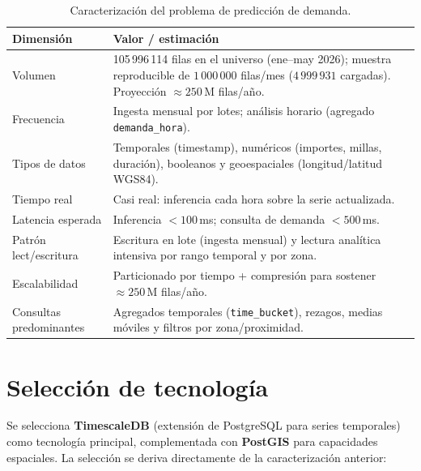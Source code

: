 \documentclass[11pt,a4paper]{article}
\begin{document}
\begin{table}[h]
\centering
\begin{tabular}{@{}p{4.6cm}p{8.6cm}@{}}
\toprule
\textbf{Dimensión} & \textbf{Valor / estimación} \\
\midrule
Volumen & 105\,996\,114 filas en el universo (ene--may 2026); muestra reproducible de
$1\,000\,000$ filas/mes ($4\,999\,931$ cargadas). Proyección $\approx 250$\,M filas/año. \\
Frecuencia & Ingesta mensual por lotes; análisis horario (agregado \texttt{demanda\_hora}). \\
Tipos de datos & Temporales (timestamp), numéricos (importes, millas, duración), booleanos y
geoespaciales (longitud/latitud WGS84). \\
Tiempo real & Casi real: inferencia cada hora sobre la serie actualizada. \\
Latencia esperada & Inferencia $< 100$\,ms; consulta de demanda $< 500$\,ms. \\
Patrón lect/escritura & Escritura en lote (ingesta mensual) y lectura analítica intensiva por
rango temporal y por zona. \\
Escalabilidad & Particionado por tiempo + compresión para sostener $\approx 250$\,M filas/año. \\
Consultas predominantes & Agregados temporales (\texttt{time\_bucket}), rezagos, medias
móviles y filtros por zona/proximidad. \\
\bottomrule
\end{tabular}
\caption{Caracterización del problema de predicción de demanda.}
\end{table}

\section{Selección de tecnología}

Se selecciona \textbf{TimescaleDB} (extensión de PostgreSQL para series temporales) como
tecnología principal, complementada con \textbf{PostGIS} para capacidades espaciales. La
selección se deriva directamente de la caracterización anterior:
\end{document}
